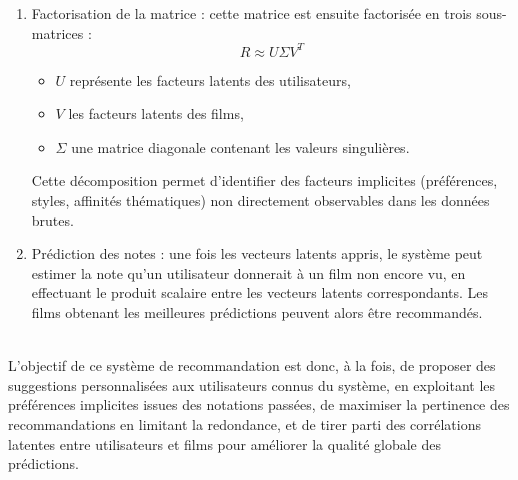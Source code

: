\documentclass{article}
\begin{document}
\begin{itemize}
\begin{enumerate}
              \item Factorisation de la matrice : cette matrice est ensuite factorisée en trois sous-matrices :\\
                    \[ R \approx U \Sigma V^T \]
                    \begin{itemize}
                        \item \(U\) représente les facteurs latents des utilisateurs,
                        \item \(V\) les facteurs latents des films,
                        \item \(\Sigma\) une matrice diagonale contenant les valeurs singulières.
                    \end{itemize}
                    Cette décomposition permet d'identifier des facteurs implicites (préférences, styles, affinités thématiques) non directement observables dans les données brutes.
              \item Prédiction des notes : une fois les vecteurs latents appris, le système peut estimer la note qu’un utilisateur donnerait à un film non encore vu, en effectuant le produit scalaire entre les vecteurs latents correspondants.
                    Les films obtenant les meilleures prédictions peuvent alors être recommandés.
          \end{enumerate}
          $ $\\
          L’objectif de ce système de recommandation est donc, à la fois, de proposer des suggestions personnalisées aux utilisateurs connus du système,
          en exploitant les préférences implicites issues des notations passées, de maximiser la pertinence des recommandations en limitant la redondance,
          et de tirer parti des corrélations latentes entre utilisateurs et films pour améliorer la qualité globale des prédictions.
          $ $\\
        

\end{itemize}
\end{document}
